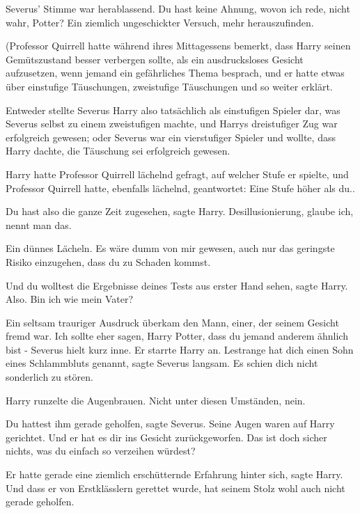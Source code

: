 Severus' Stimme war herablassend. \glqq Du hast keine Ahnung, wovon ich rede,
nicht wahr, Potter? Ein ziemlich ungeschickter Versuch, mehr
herauszufinden.\grqq{}

(Professor Quirrell hatte während ihres Mittagessens bemerkt, dass Harry seinen
Gemütszustand besser verbergen sollte, als ein ausdrucksloses Gesicht
aufzusetzen, wenn jemand ein gefährliches Thema besprach, und er hatte etwas
über einstufige Täuschungen, zweistufige Täuschungen und so weiter erklärt.

Entweder stellte Severus Harry also tatsächlich als einstufigen Spieler dar, was
Severus selbst zu einem zweistufigen machte, und Harrys dreistufiger Zug war
erfolgreich gewesen; oder Severus war ein vierstufiger Spieler und wollte, dass
Harry dachte, die Täuschung sei erfolgreich gewesen.

Harry hatte Professor Quirrell lächelnd gefragt, auf welcher Stufe er spielte,
und Professor Quirrell hatte, ebenfalls lächelnd, geantwortet: \glqq Eine Stufe
höher als du.\grqq{}.

\glqq Du hast also die ganze Zeit zugesehen\grqq{}, sagte Harry. \glqq
Desillusionierung, glaube ich, nennt man das.\grqq{}

Ein dünnes Lächeln. \glqq Es wäre dumm von mir gewesen, auch nur das geringste
Risiko einzugehen, dass du zu Schaden kommst.\grqq{}

\glqq Und du wolltest die Ergebnisse deines Tests aus erster Hand sehen\grqq{},
sagte Harry. \glqq Also. Bin ich wie mein Vater?\grqq{}

Ein seltsam trauriger Ausdruck überkam den Mann, einer, der seinem Gesicht fremd
war. \glqq Ich sollte eher sagen, Harry Potter, dass du jemand anderem ähnlich
bist -\grqq{} Severus hielt kurz inne. Er starrte Harry an. \glqq Lestrange hat
dich einen Sohn eines Schlammbluts genannt\grqq{}, sagte Severus langsam. \glqq
Es schien dich nicht sonderlich zu stören.\grqq{}

Harry runzelte die Augenbrauen. \glqq Nicht unter diesen Umständen, nein.\grqq{}

\glqq Du hattest ihm gerade geholfen\grqq{}, sagte Severus. Seine Augen waren
auf Harry gerichtet. \glqq Und er hat es dir ins Gesicht zurückgeworfen. Das ist
doch sicher nichts, was du einfach so verzeihen würdest?\grqq{}

\glqq Er hatte gerade eine ziemlich erschütternde Erfahrung hinter sich\grqq{},
sagte Harry. \glqq Und dass er von Erstklässlern gerettet wurde, hat seinem
Stolz wohl auch nicht gerade geholfen.\grqq{}


